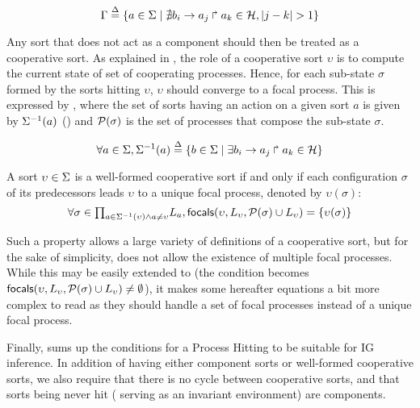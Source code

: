 \begin{equation}
\Gamma \stackrel{\Delta}= \{a \in \Sigma \mid \nexists b_i\rightarrow a_j\Rsh a_k \in \mathcal{H}, |j - k| > 1\} \\
\label{eq:PH-components}
\end{equation}

Any sort that does not act as a component should then be treated as a cooperative sort.
As explained in , the role of a cooperative sort $\upsilon$ is to compute the current
state of set of cooperating processes.
Hence, for each sub-state $\sigma$ formed by the sorts hitting $\upsilon$, $\upsilon$ should
converge to a focal process.
This is expressed by , where
the set of sorts having an action on a given sort $a$ is given by 
$\Sigma^{-1}(a)$ ()
and $\mathcal{P}(\sigma)$ is the set of processes that compose the sub-state $\sigma$.

\begin{equation}
\forall a \in \Sigma, \Sigma^{-1}(a) \stackrel{\Delta}= \{b \in \Sigma \mid \exists b_i\rightarrow a_j\Rsh a_k\in\mathcal{H} \}
\label{eq:ph_direct_predec}
\end{equation}

\begin{property}\label{pro:wf-cooperative-sort}
A sort $\upsilon\in\Sigma$ is a well-formed cooperative sort if and only if
each configuration $\sigma$ of its predecessors leads $\upsilon$ to a unique focal process,
denoted by $\upsilon(\sigma)$:
\[
\forall \sigma \in {\textstyle\prod_{
a\in\Sigma^{-1}(\upsilon) \wedge a\neq \upsilon}}
L_{a},
\mathsf{focals}(\upsilon,L_\upsilon,\mathcal{P}(\sigma)\cup L_\upsilon) = \{ \upsilon(\sigma) \}\]
\end{property}

Such a property allows a large variety of definitions of a cooperative sort, but
for the sake of simplicity, does not allow the existence of multiple focal processes.
While this may be easily extended to (the condition becomes 
$\mathsf{focals}(\upsilon,L_\upsilon, \mathcal{P}(\sigma)\cup L_\upsilon)\neq\emptyset$), it makes some
hereafter equations a bit more complex to read as they should handle a set of focal processes instead
of a unique focal process.


Finally,  sums up the conditions for a Process Hitting to be suitable for IG
inference.
In addition of having either component sorts or well-formed cooperative sorts, we also require that
there is no cycle between cooperative sorts, and that
sorts being never hit (\ie{} serving as an invariant environment) are components.

